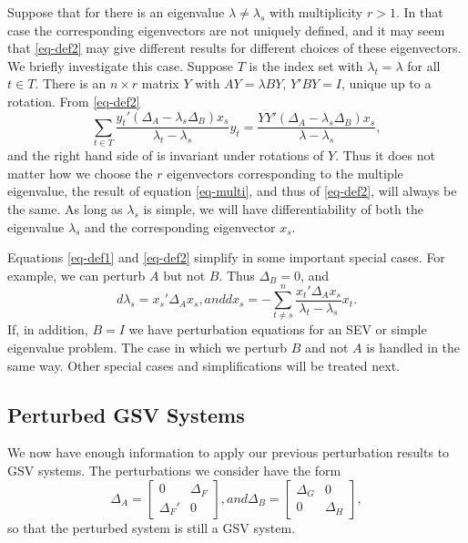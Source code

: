 \documentclass[
  12pt,
  letterpaper,
  DIV=11,
  numbers=noendperiod]{scrartcl}
\begin{document}
Suppose that for there is an eigenvalue \(\lambda\not=\lambda_s\) with
multiplicity \(r>1\). In that case the corresponding eigenvectors are
not uniquely defined, and it may seem that \eqref{eq-def2} may give
different results for different choices of these eigenvectors. We
briefly investigate this case. Suppose \(T\) is the index set with
\(\lambda_t=\lambda\) for all \(t\in  T\). There is an \(n\times r\)
matrix \(Y\) with \(AY=\lambda BY\), \(Y'BY=I\), unique up to a
rotation. From \eqref{eq-def2} \begin{equation}
\sum_{t\in T}\frac{y_t'(\Delta_A-\lambda_s\Delta_B)x_s}{\lambda_t-\lambda_s}y_t=\frac{YY'(\Delta_A-\lambda_s\Delta_B)x_s}{\lambda-\lambda_s},\label{eq-multi}
\end{equation} and the right hand side of \label{eq-multi} is invariant
under rotations of \(Y\). Thus it does not matter how we choose the
\(r\) eigenvectors corresponding to the multiple eigenvalue, the result
of equation \eqref{eq-multi}, and thus of \eqref{eq-def2}, will always
be the same. As long as \(\lambda_s\) is simple, we will have
differentiability of both the eigenvalue \(\lambda_s\) and the
corresponding eigenvector \(x_s\).

Equations \eqref{eq-def1} and \eqref{eq-def2} simplify in some important
special cases. For example, we can perturb \(A\) but not \(B\). Thus
\(\Delta_B=0\), and \begin{subequations}
\begin{equation}
d\lambda_s=x_s'\Delta_Ax_s\label{eq-sim1},
\end{equation}
and
\begin{equation}
dx_s=-\sum_{t\not= s}^n\frac{x_t'\Delta_Ax_s}{\lambda_t-\lambda_s}x_t.\label{eq-sim2}
\end{equation}
\end{subequations} If, in addition, \(B=I\) we have perturbation
equations for an SEV or simple eigenvalue problem. The case in which we
perturb \(B\) and not \(A\) is handled in the same way. Other special
cases and simplifications will be treated next.

\subsection{Perturbed GSV Systems}\label{sec-GSV}

We now have enough information to apply our previous perturbation
results to GSV systems. The perturbations we consider have the form
\begin{subequations}
\begin{equation}
\Delta_A=\begin{bmatrix}
0&\Delta_F\\
\Delta_F'&0
\end{bmatrix},\label{eq-asvdp}
\end{equation}
and
\begin{equation}
\Delta_B=\begin{bmatrix}
\Delta_G&0\\
0&\Delta_H
\end{bmatrix},\label{eq-bsvdp}
\end{equation}
\end{subequations} so that the perturbed system is still a GSV system.
\end{document}
